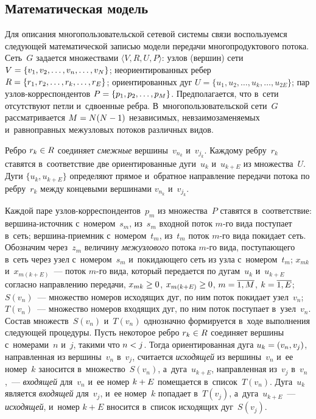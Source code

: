 \begin{multicols}{2}
\section{Математическая модель}

Для описания многопользовательской сетевой сис\-те\-мы связи  воспользуемся 
сле\-ду\-ющей математической за\-писью модели передачи многопродуктового потока.
Сеть~$G$ задается \mbox{множествами}  $\langle V, R,  U, P \rangle$:
узлов (вершин) сети  $V \hm= \{ v_1, v_2, \ldots, v_n, \ldots, v_N \}$;
неориентированных ребер $R \hm= \{ r_1, r_2,  \ldots, r_k,  \ldots, r_E \}$;
ориентированных дуг  $U = \{ u_1, u_2, \ldots, u_k, \ldots, u_{2E}\}$;
пар уз\-лов-кор\-рес\-пон\-ден\-тов $P \hm= \{ p_1, p_2,  \ldots, p_M\}$.
Предполагается, что в~сети отсутствуют пет\-ли и~сдво\-ен\-ные реб\-ра.
В~многопользовательской сети~$G$ рас\-смат\-ри\-ва\-ет\-ся $M \hm= N (N\hm-1)$ независимых, 
не\-взаи\-мо\-за\-ме\-ня\-емых и~рав\-но\-прав\-ных межузловых потоков различных ви\-дов.

Ребро $r_k \hm\in R$ со\-еди\-ня\-ет \textit{смеж\-ные} вершины~$v_{n_k}$ и~$v_{j_k}$.
Каж\-до\-му реб\-ру~$r_k$ ставятся в~соответствие две ориентированные дуги~$u_k$ 
и~$u_{k+E}$ из множества~$U$.
Дуги $\{u_k, u_{k+E}\}$ определяют прямое и~обрат\-ное на\-прав\-ле\-ние передачи потока 
по  реб\-ру~$r_k$ меж\-ду концевыми вершинами $v_{n_k}$ и~$v_{j_k}$.

Каждой паре узлов-кор\-рес\-пон\-ден\-тов~$p_m$ из множества~$P$ ставятся в~соответствие:
вер\-ши\-на-ис\-точ\-ник с~номером~$s_m$,  из~$s_m$  входной поток $m$-го вида по\-сту\-па\-ет в~сеть;
вер\-ши\-на-при\-ем\-ник с~номером~${t_m}$, из~${t_m}$ поток $m$-го вида покидает сеть.
Обозначим через~$z_m$ величину \textit{межузлового} потока $m$-го вида, по\-сту\-па\-юще\-го в~сеть через 
узел с~номером~$s_m$ и~по\-ки\-да\-юще\-го сеть из узла с~номером~$t_m$;
$x_{mk}$ и~$x_{m(k + E)}$~---  поток $m$-го вида, который передается по дугам~$u_k$ и~$u_{k + E}$ со\-глас\-но на\-прав\-ле\-нию передачи, 
$x_{mk} \hm\ge 0$, $x_{m(k + E)}\hm\ge 0$, $m \hm= \overline{1, M}$, $k \hm= \overline {1, E}$;
$S(v_n)$~--- множество номеров исходящих дуг, по ним поток покидает узел~$v_n$;
$T(v_n)$~--- множество номеров входящих дуг, по ним поток по\-сту\-па\-ет в~узел~$v_n$.
Со\-став множеств~$S(v_n)$ и~$T(v_n)$ однозначно формируется в~ходе выполнения 
сле\-ду\-ющей процедуры. Пусть некоторое реб\-ро $r_k \hm\in R$ соединяет вершины 
с~номерами~$n$ и~$j$, такими что $n\hm < j$. Тогда ориентированная дуга $u_k \hm= (v_n, v_j)$, 
на\-прав\-лен\-ная из вершины~$v_n$ в~$v_j$, считается \textit{исходящей} из 
вершины~$v_{n}$ и~ее номер~$k$ заносится в~множество~$S(v_n)$, а~дуга~$u_{k+E}$, 
на\-прав\-лен\-ная из~$v_j$ в~$v_n$,~--- \textit{входящей} для~$v_{n}$ и~ее номер $k\hm+E$ помещается в~список~$T(v_n)$.
Дуга~$u_k$ является \textit{входящей} для~$v_j$, и~ее номер~$k$ попадает 
в~$T(v_j)$, а~дуга~$u_{k+E}$~--- \textit{исходящей}, и~номер $k+E$ вносится в~список ис\-хо\-дя\-щих дуг~$S(v_j)$.


\end{multicols}
